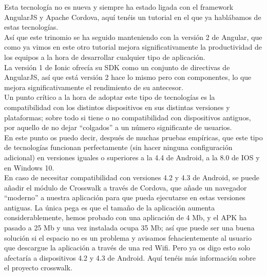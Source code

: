 \documentclass[a4paper, 11pt]{article}
\begin{document}
\begin{itemize}
              Esta tecnología no es nueva y siempre ha estado ligada con el framework AngularJS y Apache
              Cordova, aquí tenéis un tutorial en el que ya hablábamos de estas tecnologías.\\

              Así que este trinomio se ha seguido manteniendo con la versión 2 de Angular, que como ya
              vimos en este otro tutorial mejora significativamente la productividad de los equipos a
              la hora de desarrollar cualquier tipo de aplicación.\\

              La versión 1 de Ionic ofrecía su SDK como un conjunto de directivas de AngularJS, así que
              está versión 2 hace lo mismo pero con componentes, lo que mejora significativamente el
              rendimiento de su antecesor.\\

              Un punto crítico a la hora de adoptar este tipo de tecnologías es la compatibilidad con
              los distintos dispositivos en sus distintas versiones y plataformas; sobre todo si tiene
              o no compatibilidad con dispositivos antiguos, por aquello de no dejar “colgados” a un
              número significante de usuarios.\\

              En este punto os puedo decir, después de muchas pruebas empíricas, que este tipo de
              tecnologías funcionan perfectamente (sin hacer ninguna configuración adicional) en
              versiones iguales o superiores a la 4.4 de Android, a la 8.0 de IOS y en Windows 10.\\

              En caso de necesitar compatibilidad con versiones 4.2 y 4.3 de Android, se puede
              añadir el módulo de Crosswalk a través de Cordova, que añade un navegador “moderno”
              a nuestra aplicación para que pueda ejecutarse en estas versiones antiguas.
              La única pega es que el tamaño de la aplicación aumenta considerablemente, hemos
              probado con una aplicación de 4 Mb, y el APK ha pasado a 25 Mb y una vez
              instalada ocupa 35 Mb; así que puede ser una buena solución si el espacio no es
              un problema y avisamos fehacientemente al usuario que descargue la aplicación a
              través de una red Wifi. Pero ya os digo esto solo afectaría a dispositivos 4.2 y
              4.3 de Android. Aquí tenéis más información sobre el proyecto crosswalk.\\


\end{itemize}
\end{document}
